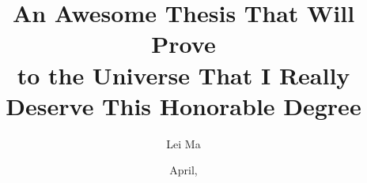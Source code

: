 \documentclass[botnum, fleqn]{unmeethesis}
\begin{document}
\frontmatter




\title{An Awesome Thesis That Will Prove \\ to the Universe
       That I Really Deserve This Honorable Degree}

\author{Lei Ma}





\date{April, \thisyear}

\maketitle





\maketitleabstract %



\tableofcontents
\listoffigures
\listoftables




\mainmatter

\setcounter{chapter}{-1}  %







\printbibliography

%
%


%
%
\end{document}
